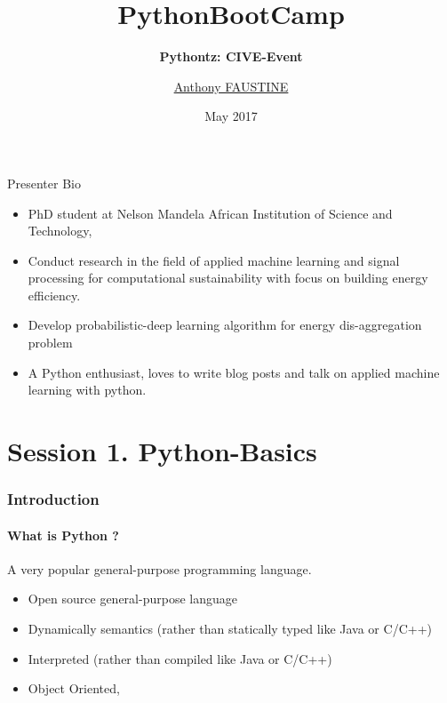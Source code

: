 \documentclass{bredelebeamer}
\title[pythontz]{\textbf{PythonBootCamp}}
\subtitle{\textbf{Pythontz: CIVE-Event} }
\author{ \href{https://sambaiga.github.io/ }{\href{https://sambaiga.github.io/}{Anthony FAUSTINE} }}
\date{May 2017}
\begin{document}
\begin{frame}
	\titlepage
\end{frame}








\begin{frame}{Presenter Bio}
\begin{itemize}
\item PhD student at Nelson Mandela African Institution of Science and Technology, \\  
\item Conduct research in the field of applied machine learning and signal processing for computational sustainability with focus on building energy efficiency.\\
\item Develop probabilistic-deep learning algorithm for energy dis-aggregation problem\\
\item A Python enthusiast, loves to write blog posts and talk on applied machine learning with python.
\end{itemize}
\end{frame}
\section{Session 1. Python-Basics}

\begin{frame}\frametitle{Introduction}
\framesubtitle{What is Python ?}
A very popular general-purpose programming language.
\begin{itemize}
\item Open source general-purpose language
\item Dynamically semantics (rather than statically typed like Java or C/C++)
\item Interpreted (rather than compiled like Java or C/C++)
\item Object Oriented, 
\end{itemize}
\end{frame}	
\end{document}
